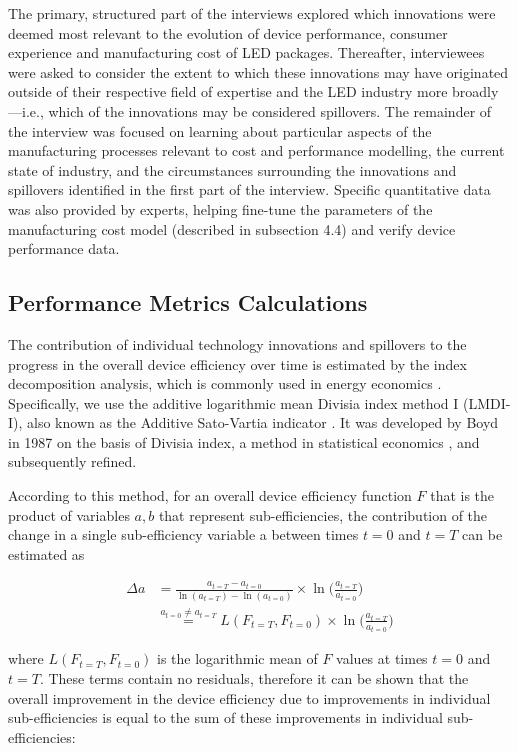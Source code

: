 \documentclass[twoside,twocolumn,9pt]{article}
\begin{document}
The primary, structured part of the interviews explored which innovations were deemed most relevant to the evolution of device performance, consumer experience and manufacturing cost of LED packages. Thereafter, interviewees were asked to consider the extent to which these innovations may have originated outside of their respective field of expertise and the LED industry more broadly—i.e., which of the innovations may be considered spillovers. The remainder of the interview was focused on learning about particular aspects of the manufacturing processes relevant to cost and performance modelling, the current state of industry, and the circumstances surrounding the innovations and spillovers identified in the first part of the interview. Specific quantitative data was also provided by experts, helping fine-tune the parameters of the manufacturing cost model (described in subsection 4.4) and verify device performance data.

\subsection{Performance Metrics Calculations}
\label{subsec:metrics}

The contribution of individual technology innovations and spillovers to the progress in the overall device efficiency over time is estimated by the index decomposition analysis, which is commonly used in energy economics \cite{Ang1997}. Specifically, we use the additive logarithmic mean Divisia index method I (LMDI-I), also known as the Additive Sato-Vartia indicator \cite{deBoer2019}. It was developed by Boyd in 1987 \cite{Boyd1987} on the basis of Divisia index, a method in statistical economics \cite{Diewert1988}, and subsequently refined.

According to this method, for an overall device efficiency function $F$ that is the product of variables $a, b$ that represent sub-efficiencies, the contribution of the change  in a single sub-efficiency variable a between times $t=0$ and $t=T$ can be estimated as \cite{Ang2019}

\begin{align}
    \Delta a &= \frac{a_{t=T} - a_{t=0}}{\ln(a_{t=T}) - \ln(a_{t=0})} \times \ln \big ( \frac{a_{t=T}}{a_{t=0}} \big ) \\
    & \stackrel{a_{t=0} \neq a_{t=T}}{=} L(F_{t=T}, F_{t=0}) \times \ln \big ( \frac{a_{t=T}}{a_{t=0}} \big )
\end{align}

where $L(F_{t=T}, F_{t=0})$ is the logarithmic mean of $F$ values at times $t=0$ and $t=T$. These terms contain no residuals, therefore it can be shown that the overall improvement in the device efficiency due to improvements in individual sub-efficiencies is equal to the sum of these improvements in individual sub-efficiencies: 
\end{document}

